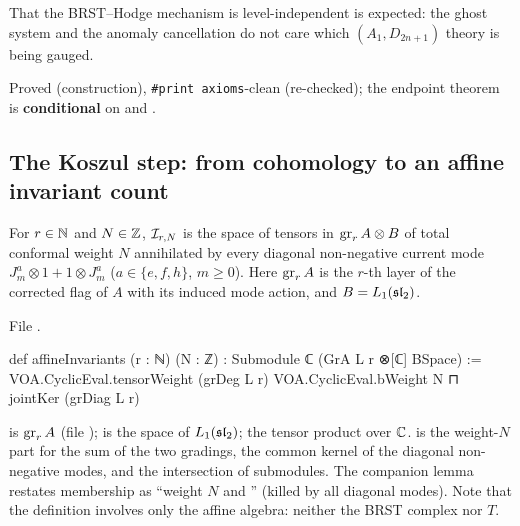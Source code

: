 \begin{physics}
That the BRST--Hodge mechanism is level-independent is expected: the ghost system and the anomaly cancellation do not
care which $(A_1,D_{2n+1})$ theory is being gauged.
\end{physics}

\begin{status}
Proved (construction), \texttt{\#print axioms}-clean (re-checked); the endpoint theorem is \textbf{conditional} on
 and .
\end{status}

\subsection{The Koszul step: from cohomology to an affine invariant count}

\begin{definition}\label{l29:def:invariants}
For $r\in{\mathbb{N}}$ and $N\in{\mathbb{Z}}$, $\mathcal I_{r,N}$ is the space of tensors in $\operatorname{gr}_rA\otimes B$ of total
conformal weight $N$ annihilated by every diagonal non-negative current mode $J^a_m\otimes1+1\otimes J^a_m$
($a\in\{e,f,h\}$, $m\ge0$). Here $\operatorname{gr}_rA$ is the $r$-th layer of the corrected flag of $A$ with its induced
mode action, and $B=L_1(\mathfrak{sl}_2)$.
\end{definition}

\noindent File .
\begin{leancode}
def affineInvariants (r : ℕ) (N : ℤ) : Submodule ℂ (GrA L r ⊗[ℂ] BSpace) :=
  VOA.CyclicEval.tensorWeight (grDeg L r) VOA.CyclicEval.bWeight N ⊓ jointKer (grDiag L r)
\end{leancode}

\begin{dictionary}
 is $\operatorname{gr}_rA$ (file );  is the space of
$L_1(\mathfrak{sl}_2)$;  the tensor product over ${\mathbb{C}}$.  is the weight-$N$ part for the
sum of the two gradings,  the common kernel of the diagonal non-negative modes, and
 the intersection of submodules. The companion lemma  restates membership as
``weight $N$ and '' (killed by all diagonal modes). Note that the definition involves only the affine
algebra: neither the BRST complex nor $T$.
\end{dictionary}

